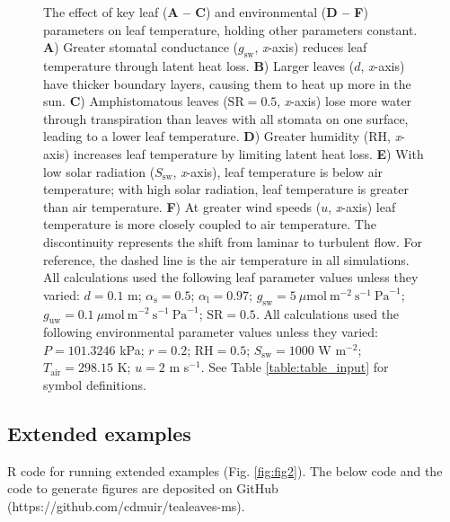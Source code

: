 \documentclass[11pt, oneside]{article}
\begin{document}
\begin{figure}[t!]
\caption{The effect of key leaf (\textbf{A -- C}) and environmental (\textbf{D -- F}) parameters on leaf temperature, holding other parameters constant. \textbf{A}) Greater stomatal conductance ($g_\mathrm{sw}$, \textit{x}-axis) reduces leaf temperature through latent heat loss. \textbf{B}) Larger leaves ($d$, \textit{x}-axis) have thicker boundary layers, causing them to heat up more in the sun. \textbf{C}) Amphistomatous leaves ($\mathrm{SR} = 0.5$, \textit{x}-axis) lose more water through transpiration than leaves with all stomata on one surface, leading to a lower leaf temperature. \textbf{D}) Greater humidity ($\mathrm{RH}$, \textit{x}-axis) increases leaf temperature by limiting latent heat loss. \textbf{E}) With low solar radiation ($S_\mathrm{sw}$, \textit{x}-axis), leaf temperature is below air temperature; with high solar radiation, leaf temperature is greater than air temperature. \textbf{F}) At greater wind speeds ($u$, \textit{x}-axis) leaf temperature is more closely coupled to air temperature. The discontinuity represents the shift from laminar to turbulent flow. For reference, the dashed line is the air temperature in all simulations. All calculations used the following leaf parameter values unless they varied: $d = 0.1$ m; $\alpha_\mathrm{s} = 0.5$; $\alpha_\mathrm{l} = 0.97$; $g_\mathrm{sw} = 5~\mu \textrm{mol}~\textrm{m} ^ {-2}~\textrm{s} ^ {-1}~\textrm{Pa} ^ {-1}$; $g_\mathrm{uw} = 0.1~\mu \textrm{mol}~\textrm{m} ^ {-2}~\textrm{s} ^ {-1}~\textrm{Pa} ^ {-1}$; $\mathrm{SR} = 0.5$. All calculations used the following environmental parameter values unless they varied: $P = 101.3246$ kPa; $r = 0.2$; $\mathrm{RH} = 0.5$; $S_\mathrm{sw} = 1000$ W m$^{-2}$; $T_\mathrm{air} = 298.15$ K; $u = 2$ m s$^{-1}$. See Table \ref{table:table_input} for symbol definitions.}
\label{fig:figS1}
\end{figure}

\clearpage


\subsection*{Extended examples}

R code for running extended examples (Fig. \ref{fig:fig2}). The below code and the code to generate figures are deposited on GitHub (https://github.com/cdmuir/tealeaves-ms).
 
\end{document}
